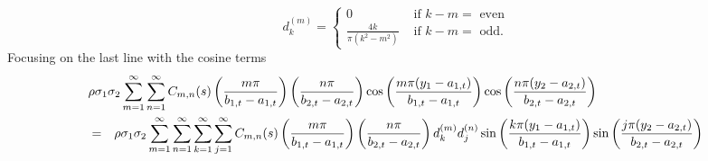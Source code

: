\[
	d^{(m)}_k = \left\{ \begin{array}{cr} 0 & \mbox{ if } k-m = \mbox{ even} \\
			\frac{4k}{\pi(k^2 - m^2)} & \mbox{ if } k-m = \mbox{ odd.} \end{array} \right.
\]
Focusing on the last line with the cosine terms
\begin{eqnarray}
	\lefteqn{ \rho \sigma_1 \sigma_2 \sum_{m=1}^\infty \sum_{n=1}^\infty C_{m,n}(s) \left( \frac{m\pi}{b_{1,t}-a_{1,t}} \right) \left( \frac{n\pi}{b_{2,t}-a_{2,t}} \right) \cos\left( \frac{m \pi (y_1 - a_{1,t})}{b_{1,t} - a_{1,t}} \right) \cos\left( \frac{n \pi (y_2 - a_{2,t})}{b_{2,t} - a_{2,t}} \right) } \label{eq:ch3-mixed-term} \\
	&=& \rho \sigma_1 \sigma_2 \sum_{m=1}^\infty \sum_{n=1}^\infty \sum_{k = 1}^\infty \sum_{j=1}^\infty C_{m,n}(s) \left( \frac{m\pi}{b_{1,t}-a_{1,t}} \right) \left( \frac{n\pi}{b_{2,t}-a_{2,t}} \right) d_{k}^{(m)} d_{j}^{(n)} \sin\left( \frac{k \pi (y_1 - a_{1,t})}{b_{1,t} - a_{1,t}} \right)\sin\left( \frac{j \pi (y_2 - a_{2,t})}{b_{2,t} - a_{2,t}} \right) \nonumber
\end{eqnarray}

